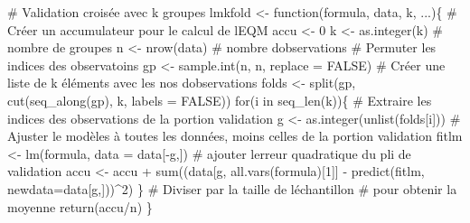 \documentclass[
  11pt,
  letterpaper,
]{scrbook}
\newenvironment{Shaded}{\begin{snugshade}}{\end{snugshade}}
\newcommand{\AttributeTok}[1]{\textcolor[rgb]{0.40,0.45,0.13}{#1}}
\newcommand{\CommentTok}[1]{\textcolor[rgb]{0.37,0.37,0.37}{#1}}
\newcommand{\ConstantTok}[1]{\textcolor[rgb]{0.56,0.35,0.01}{#1}}
\newcommand{\ControlFlowTok}[1]{\textcolor[rgb]{0.00,0.23,0.31}{#1}}
\newcommand{\DecValTok}[1]{\textcolor[rgb]{0.68,0.00,0.00}{#1}}
\newcommand{\FunctionTok}[1]{\textcolor[rgb]{0.28,0.35,0.67}{#1}}
\newcommand{\NormalTok}[1]{\textcolor[rgb]{0.00,0.23,0.31}{#1}}
\newcommand{\OtherTok}[1]{\textcolor[rgb]{0.00,0.23,0.31}{#1}}
\newcommand{\SpecialCharTok}[1]{\textcolor[rgb]{0.37,0.37,0.37}{#1}}
\theoremstyle{definition}
\theoremstyle{remark}
\begin{document}
\begin{Shaded}
\begin{Highlighting}[]
\CommentTok{\# Validation croisée avec k groupes}
\NormalTok{lmkfold }\OtherTok{\textless{}{-}} \ControlFlowTok{function}\NormalTok{(formula, data, k, ...)\{}
   \CommentTok{\# Créer un accumulateur pour le calcul de l\textquotesingle{}EQM}
\NormalTok{   accu }\OtherTok{\textless{}{-}} \DecValTok{0}
\NormalTok{   k }\OtherTok{\textless{}{-}} \FunctionTok{as.integer}\NormalTok{(k) }\CommentTok{\# nombre de groupes}
\NormalTok{   n }\OtherTok{\textless{}{-}} \FunctionTok{nrow}\NormalTok{(data) }\CommentTok{\# nombre d\textquotesingle{}observations}
   \CommentTok{\# Permuter les indices des observatoins}
\NormalTok{   gp }\OtherTok{\textless{}{-}} \FunctionTok{sample.int}\NormalTok{(n, n, }\AttributeTok{replace =} \ConstantTok{FALSE}\NormalTok{)}
   \CommentTok{\# Créer une liste de k éléments avec les nos d\textquotesingle{}observations}
\NormalTok{   folds }\OtherTok{\textless{}{-}} \FunctionTok{split}\NormalTok{(gp, }\FunctionTok{cut}\NormalTok{(}\FunctionTok{seq\_along}\NormalTok{(gp), k, }\AttributeTok{labels =} \ConstantTok{FALSE}\NormalTok{))}
   \ControlFlowTok{for}\NormalTok{(i }\ControlFlowTok{in} \FunctionTok{seq\_len}\NormalTok{(k))\{}
      \CommentTok{\# Extraire les indices des observations de la portion validation}
\NormalTok{      g }\OtherTok{\textless{}{-}} \FunctionTok{as.integer}\NormalTok{(}\FunctionTok{unlist}\NormalTok{(folds[i]))}
      \CommentTok{\# Ajuster le modèles à toutes les données, }
\NormalTok{      moins celles de la portion validation}
\NormalTok{      fitlm }\OtherTok{\textless{}{-}} \FunctionTok{lm}\NormalTok{(formula, }\AttributeTok{data =}\NormalTok{ data[}\SpecialCharTok{{-}}\NormalTok{g,])}
      \CommentTok{\# ajouter l\textquotesingle{}erreur quadratique du pli de validation}
\NormalTok{      accu }\OtherTok{\textless{}{-}}\NormalTok{ accu }\SpecialCharTok{+} 
          \FunctionTok{sum}\NormalTok{((data[g, }\FunctionTok{all.vars}\NormalTok{(formula)[}\DecValTok{1}\NormalTok{]] }\SpecialCharTok{{-}} 
                \FunctionTok{predict}\NormalTok{(fitlm, }\AttributeTok{newdata=}\NormalTok{data[g,]))}\SpecialCharTok{\^{}}\DecValTok{2}\NormalTok{)}
\NormalTok{   \}}
   \CommentTok{\# Diviser par la taille de l\textquotesingle{}échantillon }
   \CommentTok{\# pour obtenir la moyenne}
   \FunctionTok{return}\NormalTok{(accu}\SpecialCharTok{/}\NormalTok{n)}
\NormalTok{\}}


\end{Highlighting}
\end{Shaded}
\end{document}
